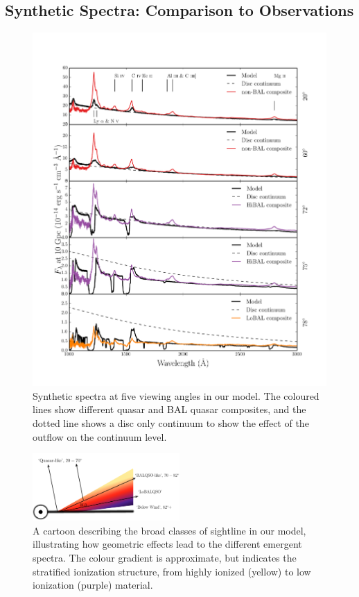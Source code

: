 \documentclass[useAMS,usenatbib]{mn2e_x}
\begin{document}
\subsection{Synthetic Spectra: Comparison to Observations}

\begin{figure} %
\centering
\includegraphics[width=1.0\textwidth]{figures/uvspec.png}
\caption
{
Synthetic spectra at five viewing angles in our model. The coloured lines
show different quasar and BAL quasar composites, and the dotted line shows a disc
only continuum to show the effect of the outflow on the continuum level.  
}
\label{fig:uvspec}
\end{figure} %

\begin{figure}
\centering
\includegraphics[width=0.5\textwidth]{figures/windnew3.png}
\caption
{
A cartoon describing the broad classes of sightline 
in our model, illustrating how geometric effects lead to 
the different emergent spectra. The colour gradient is approximate,
but indicates the stratified ionization structure, 
from highly ionized (yellow) to low ionization (purple) material.
}
\label{fig:sightline}
\end{figure}
\end{document}
